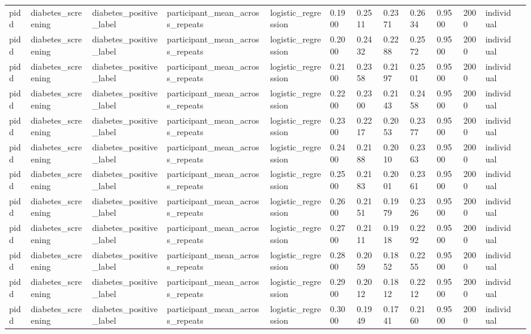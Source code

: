 \begin{tabular}{lllllllllllll}
pidd & diabetes\_screening & diabetes\_positive\_label & participant\_mean\_across\_repeats & logistic\_regression & 0.1900 & 0.2511 & 0.2371 & 0.2634 & 0.9500 & 2000 & individual &  \\
pidd & diabetes\_screening & diabetes\_positive\_label & participant\_mean\_across\_repeats & logistic\_regression & 0.2000 & 0.2432 & 0.2288 & 0.2572 & 0.9500 & 2000 & individual &  \\
pidd & diabetes\_screening & diabetes\_positive\_label & participant\_mean\_across\_repeats & logistic\_regression & 0.2100 & 0.2358 & 0.2197 & 0.2501 & 0.9500 & 2000 & individual &  \\
pidd & diabetes\_screening & diabetes\_positive\_label & participant\_mean\_across\_repeats & logistic\_regression & 0.2200 & 0.2300 & 0.2143 & 0.2458 & 0.9500 & 2000 & individual &  \\
pidd & diabetes\_screening & diabetes\_positive\_label & participant\_mean\_across\_repeats & logistic\_regression & 0.2300 & 0.2217 & 0.2053 & 0.2377 & 0.9500 & 2000 & individual &  \\
pidd & diabetes\_screening & diabetes\_positive\_label & participant\_mean\_across\_repeats & logistic\_regression & 0.2400 & 0.2188 & 0.2010 & 0.2363 & 0.9500 & 2000 & individual &  \\
pidd & diabetes\_screening & diabetes\_positive\_label & participant\_mean\_across\_repeats & logistic\_regression & 0.2500 & 0.2183 & 0.2001 & 0.2361 & 0.9500 & 2000 & individual &  \\
pidd & diabetes\_screening & diabetes\_positive\_label & participant\_mean\_across\_repeats & logistic\_regression & 0.2600 & 0.2151 & 0.1979 & 0.2326 & 0.9500 & 2000 & individual &  \\
pidd & diabetes\_screening & diabetes\_positive\_label & participant\_mean\_across\_repeats & logistic\_regression & 0.2700 & 0.2111 & 0.1918 & 0.2292 & 0.9500 & 2000 & individual &  \\
pidd & diabetes\_screening & diabetes\_positive\_label & participant\_mean\_across\_repeats & logistic\_regression & 0.2800 & 0.2059 & 0.1852 & 0.2255 & 0.9500 & 2000 & individual &  \\
pidd & diabetes\_screening & diabetes\_positive\_label & participant\_mean\_across\_repeats & logistic\_regression & 0.2900 & 0.2012 & 0.1812 & 0.2212 & 0.9500 & 2000 & individual &  \\
pidd & diabetes\_screening & diabetes\_positive\_label & participant\_mean\_across\_repeats & logistic\_regression & 0.3000 & 0.1949 & 0.1741 & 0.2160 & 0.9500 & 2000 & individual &  \\

\end{tabular}
